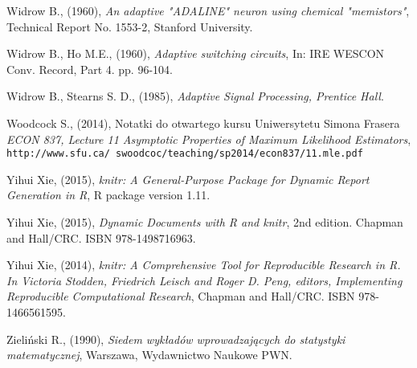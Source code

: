 \begin{thebibliography}{99}
 Widrow B., (1960), \textit{An adaptive "ADALINE" neuron using chemical "memistors"}, Technical Report No. 1553-2, Stanford University.

 Widrow B., Ho M.E., (1960), \textit{Adaptive switching circuits}, In: IRE WESCON Conv.
Record, Part 4. pp. 96-104.

 Widrow B., Stearns S. D., (1985), \textit{Adaptive Signal Processing, Prentice Hall}.


  Woodcock S., (2014), Notatki do otwartego kursu Uniwersytetu Simona Frasera \textit{ECON 837, Lecture 11 Asymptotic Properties of Maximum Likelihood Estimators}, \\ \texttt{http://www.sfu.ca/~swoodcoc/teaching/sp2014/econ837/11.mle.pdf}


 Yihui Xie, (2015), \textit{knitr: A General-Purpose Package for Dynamic Report Generation in R}, R package version 1.11.

 Yihui Xie, (2015), \textit{Dynamic Documents with R and knitr}, 2nd edition. Chapman and Hall/CRC. ISBN 978-1498716963.

 Yihui Xie, (2014), \textit{knitr: A Comprehensive Tool for Reproducible Research in R. In Victoria Stodden, Friedrich Leisch and Roger D. Peng, editors, Implementing Reproducible Computational Research}, Chapman and Hall/CRC. ISBN 978-1466561595.


 Zieliński R., (1990), \textit{Siedem wykładów wprowadzających do statystyki matematycznej}, Warszawa, Wydawnictwo Naukowe PWN.


\end{thebibliography}
